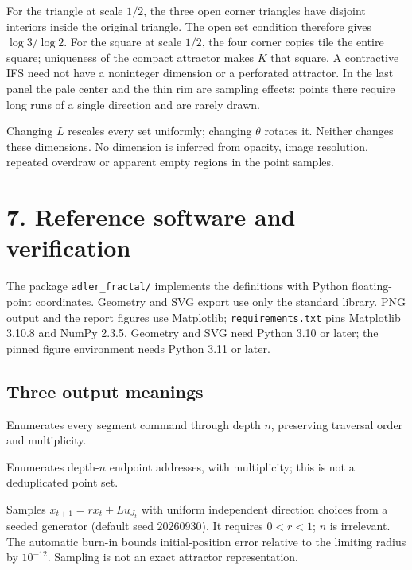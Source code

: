 \documentclass[11pt,a4paper]{article}
\newcommand{\sectiontitle}[1]{\section*{\sffamily\color{ink}#1}}
\begin{document}
For the triangle at scale $1/2$, the three open corner triangles have
disjoint interiors inside the original triangle. The open set condition
therefore gives $\log 3/\log2$. For the square at scale $1/2$, the four
corner copies tile the entire square; uniqueness of the compact
attractor makes $K$ that square. A contractive IFS need not have a
noninteger dimension or a perforated attractor. In the last panel the
pale center and the thin rim are sampling effects: points there require
long runs of a single direction and are rarely drawn.

Changing $L$ rescales every set uniformly; changing $\theta$ rotates it.
Neither changes these dimensions. No dimension is inferred from opacity,
image resolution, repeated overdraw or apparent empty regions in the point
samples.

\newpage
\sectiontitle{7. Reference software and verification}
The package \texttt{adler\_fractal/} implements the definitions with
Python floating-point coordinates. Geometry and SVG export use only the
standard library. PNG output and the report figures use Matplotlib;
\texttt{requirements.txt} pins Matplotlib 3.10.8 and NumPy 2.3.5.
Geometry and SVG need Python 3.10 or later; the pinned figure environment
needs Python 3.11 or later.

\subsection*{Three output meanings}
\begin{description}[leftmargin=24mm,labelwidth=22mm,labelsep=2mm,font=\normalfont\ttfamily]
\item[\texttt{trace}] Enumerates every segment command through depth $n$,
preserving traversal order and multiplicity.
\item[\texttt{endpoints}] Enumerates depth-$n$ endpoint addresses, with
multiplicity; this is not a deduplicated point set.
\item[\texttt{chaos}] Samples $x_{t+1}=rx_t+Lu_{J_t}$ with uniform independent
direction choices from a seeded generator (default seed 20260930). It
requires $0<r<1$; $n$ is irrelevant. The automatic burn-in bounds
initial-position error relative to the limiting radius by $10^{-12}$.
Sampling is not an exact attractor representation.
\end{description}
\end{document}
